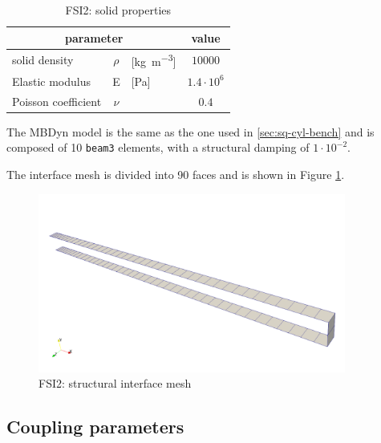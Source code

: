 \begin{table}[!htb]
	\begin{center}
		\begin{tabular}{ l c  l | c } 
			\multicolumn{3}{c|}{parameter} & value    \\ 
			\hline
			solid density  & $\rho$ & [\si{kg.m^{-3}}] & $10000$    \\
			Elastic modulus  & E & [\si{Pa}] & $1.4\cdot 10^6$    \\
			Poisson coefficient & $\nu$ & & $0.4$  \\
		\end{tabular}
	\end{center}
	\caption{FSI2: solid properties}
	\label{table:FSI2-solid}
\end{table}

The MBDyn model is the same as the one used in \ref{sec:sq-cyl-bench} and is composed of 10 \texttt{beam3} elements, with a structural damping of $1\cdot10^{-2}$.

The interface mesh is divided into 90 faces and is shown in Figure \ref{fig:FSI2_struct_mesh}. 

\begin{figure}[htbp!]
	\centering
	\includegraphics[width=0.9\textwidth, trim=0 50 0 150, clip]{images/FSI2/fsi2_struct_mesh.png}
	\caption{FSI2: structural interface mesh}
	\label{fig:FSI2_struct_mesh}
\end{figure}


\subsection{Coupling parameters}


